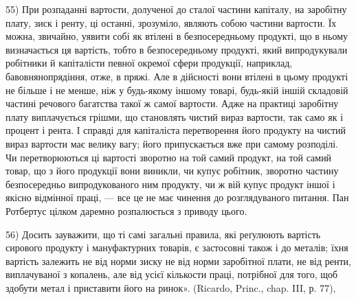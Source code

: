 55) При розпаданні вартости, долученої до сталої частини капіталу, на заробітну плату, зиск і ренту,
ці останні, зрозуміло, являють собою частини вартости. Їх можна, звичайно, уявити собі як втілені в
безпосередньому продукті, що в ньому визначається ця вартість, тобто в безпосередньому продукті,
який випродукували робітники й капіталісти певної окремої сфери продукції, наприклад,
бавовнянопрядіння, отже, в пряжі. Але в дійсності вони втілені в цьому продукті не більше і не
менше, ніж у будь-якому іншому товарі, будь-якій іншій складовій частині речового багатства такої ж
самої вартости. Адже на практиці заробітну плату виплачується грішми, що становлять чистий вираз
вартости, так само як і процент і рента. І справді для капіталіста перетворення його продукту на
чистий вираз вартости має велику вагу; його припускається вже при самому розподілі. Чи
перетворюються ці вартості зворотно на той самий продукт, на той самий товар, що з його продукції
вони виникли, чи купує
робітник, зворотно частину безпосередньо випродукованого ним продукту, чи ж вій купує продукт іншої
і якісно відмінної праці, — все це не має чинення до розглядуваного питання. Пан Ротбертус цілком
даремно розпалюється з приводу цього.

56) Досить зауважити, що ті самі загальні правила, які реґулюють вартість сирового продукту і
мануфактурних товарів, є застосовні також і до металів; їхня вартість залежить не від норми зиску не
від норми заробітної плати, не від ренти, виплачуваної з копалень, але від усієї кількости праці,
потрібної для того, щоб здобути метал і приставити його на ринок». (Ricardo, Princ., chap. III, р.
77),
